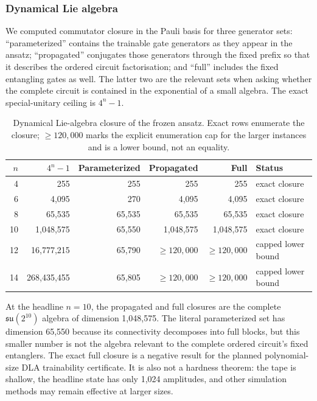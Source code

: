 \documentclass[conference]{IEEEtran}
\begin{document}
\subsubsection{Dynamical Lie algebra}
We computed commutator closure in the Pauli basis for three generator sets:
``parameterized'' contains the trainable gate generators as they appear in the
ansatz; ``propagated'' conjugates those generators through the fixed prefix so
that it describes the ordered circuit factorisation; and ``full'' includes the
fixed entangling gates as well. The latter two are the relevant sets when
asking whether the complete circuit is contained in the exponential of a
small algebra. The exact special-unitary ceiling is $4^n-1$.

\begin{table}[!t]
\caption{Dynamical Lie-algebra closure of the frozen ansatz. Exact rows enumerate the closure; $\geq 120{,}000$ marks the explicit enumeration cap for the larger instances and is a lower bound, not an equality.}
\label{tab:dla}
\centering
\small
\begin{tabular}{@{}rrrrrl@{}}
\toprule
\textbf{$n$} & \textbf{$4^n-1$} & \textbf{Parameterized} & \textbf{Propagated} & \textbf{Full} & \textbf{Status} \\
\midrule
4 & 255 & 255 & 255 & 255 & exact closure \\
6 & 4,095 & 270 & 4,095 & 4,095 & exact closure \\
8 & 65,535 & 65,535 & 65,535 & 65,535 & exact closure \\
10 & 1,048,575 & 65,550 & 1,048,575 & 1,048,575 & exact closure \\
12 & 16,777,215 & 65,790 & $\geq120,000$ & $\geq120,000$ & capped lower bound \\
14 & 268,435,455 & 65,805 & $\geq120,000$ & $\geq120,000$ & capped lower bound \\
\bottomrule
\end{tabular}
\end{table}

At the headline $n=10$, the propagated and full closures are the complete
$\mathfrak{su}(2^{10})$ algebra of dimension 1,048,575. The literal
parameterized set has dimension 65,550 because its connectivity decomposes into
full blocks, but this smaller number is not the algebra relevant to the complete
ordered circuit's fixed entanglers. The exact full closure is a negative result
for the planned polynomial-size DLA trainability certificate. It is also not a
hardness theorem: the tape is shallow, the headline state has only 1,024
amplitudes, and other simulation methods may remain effective at larger sizes.
\end{document}
